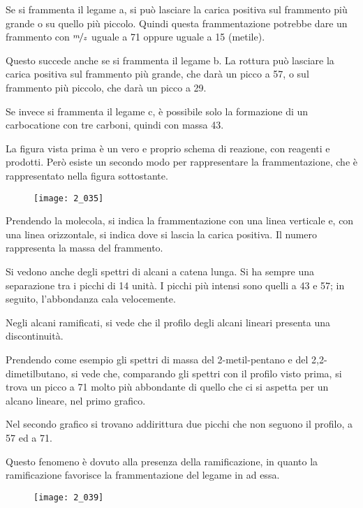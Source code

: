 Se si frammenta il legame a, si può lasciare la carica positiva sul
frammento più grande o su quello più piccolo. Quindi questa
frammentazione potrebbe dare un frammento con $\nicefrac{m}{z}$ uguale a 71 oppure
uguale a 15 (metile).

Questo succede anche se si frammenta il legame b. La rottura può
lasciare la carica positiva sul frammento più grande, che darà un picco
a 57, o sul frammento più piccolo, che darà un picco a 29.

Se invece si frammenta il legame c, è possibile solo la formazione di un
carbocatione con tre carboni, quindi con massa 43.

La figura vista prima è un vero e proprio schema di reazione, con
reagenti e prodotti. Però esiste un secondo modo per rappresentare la
frammentazione, che è rappresentato nella figura sottostante.

\begin{figure}[H]
  \texttt{[image: 2\_035]}
\end{figure}

Prendendo la molecola, si indica la frammentazione con una linea
verticale e, con una linea orizzontale, si indica dove si lascia la
carica positiva. Il numero rappresenta la massa del frammento.

Si vedono anche degli spettri di alcani a catena lunga. Si ha sempre una
separazione tra i picchi di 14 unità. I picchi più intensi sono quelli a
43 e 57; in seguito, l'abbondanza cala velocemente.

Negli alcani ramificati, si vede che il profilo degli alcani lineari
presenta una discontinuità.



Prendendo come esempio gli spettri di massa del 2-metil-pentano e del
2,2-dimetilbutano, si vede che, comparando gli spettri con il profilo
visto prima, si trova un picco a 71 molto più abbondante di quello che
ci si aspetta per un alcano lineare, nel primo grafico.

Nel secondo grafico si trovano addirittura due picchi che non seguono il
profilo, a 57 ed a 71.

Questo fenomeno è dovuto alla presenza della ramificazione, in quanto la
ramificazione favorisce la frammentazione del legame in \alpha{} ad
essa.

\begin{figure}[H]
  \texttt{[image: 2\_039]}
\end{figure}

